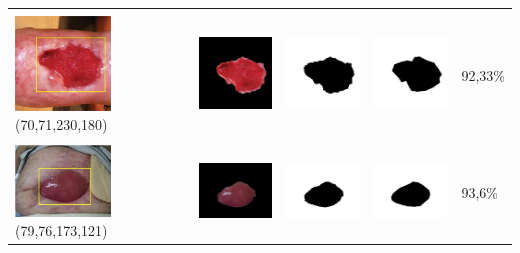 \begin{table}[H]
\begin{tabular}{|m{1.0in}|m{1.0in}|m{1.0in}|m{1.0in}|m{0.6in}|}
		&  &  & \\
		\includegraphics[width=1.0in]{gambar/hasil_segmentasi/luka_merah/image_33_rect.jpg} {\centering\fontsize{10}{10}\selectfont(70,71,230,180)}&
		\includegraphics[width=1.0in]{gambar/hasil_segmentasi/luka_merah/result_33.jpg}&
		\includegraphics[width=1.0in]{gambar/hasil_segmentasi/luka_merah/mask_r_33.jpg}&
		\includegraphics[width=1.0in]{gambar/hasil_segmentasi/luka_merah/33_r.jpg}&
		92,33\% \\
		\hline

		&  &  & \\
		\includegraphics[width=1.0in]{gambar/hasil_segmentasi/luka_merah/image_37_rect.jpg} {\centering\fontsize{10}{10}\selectfont(79,76,173,121)}&
		\includegraphics[width=1.0in]{gambar/hasil_segmentasi/luka_merah/result_37.jpg}&
		\includegraphics[width=1.0in]{gambar/hasil_segmentasi/luka_merah/mask_r_37.jpg}&
		\includegraphics[width=1.0in]{gambar/hasil_segmentasi/luka_merah/37_r.jpg}&
		93,6\% \\
		\hline


\end{tabular}
\end{table}

